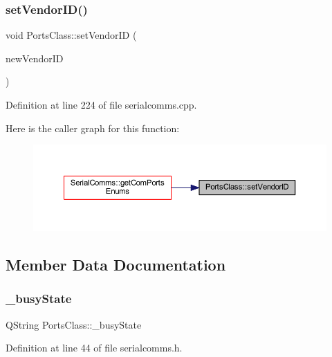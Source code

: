\subsubsection{\texorpdfstring{setVendorID()}{setVendorID()}}
{\footnotesize\ttfamily void Ports\+Class\+::set\+Vendor\+ID (\begin{DoxyParamCaption}\item[{Q\+String}]{new\+Vendor\+ID }\end{DoxyParamCaption})}



Definition at line 224 of file serialcomms.\+cpp.

Here is the caller graph for this function\+:
\nopagebreak
\begin{figure}[H]
\begin{center}
\leavevmode
\includegraphics[width=350pt]{classPortsClass_af42f48bd88679919b34f19f0f05673c1_icgraph}
\end{center}
\end{figure}


\subsection{Member Data Documentation}
\mbox{\label{classPortsClass_a2b0fb1fe4e32ba5f05a3fe29433b2734}} 
\subsubsection{\texorpdfstring{\_busyState}{\_busyState}}
{\footnotesize\ttfamily Q\+String Ports\+Class\+::\+\_\+busy\+State\hspace{0.3cm}{\ttfamily [private]}}



Definition at line 44 of file serialcomms.\+h.

\mbox{\label{classPortsClass_abb945feb83936d92f49d2d83c9ffe9c7}} 
